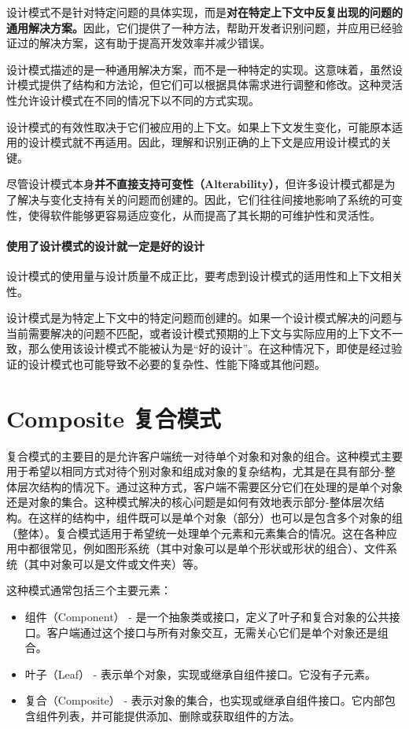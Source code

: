 设计模式不是针对特定问题的具体实现，而是\textbf{对在特定上下文中反复出现的问题的通用解决方案。}因此，它们提供了一种方法，帮助开发者识别问题，并应用已经验证过的解决方案，这有助于提高开发效率并减少错误。

设计模式描述的是一种通用解决方案，而不是一种特定的实现。这意味着，虽然设计模式提供了结构和方法论，但它们可以根据具体需求进行调整和修改。这种灵活性允许设计模式在不同的情况下以不同的方式实现。

设计模式的有效性取决于它们被应用的上下文。如果上下文发生变化，可能原本适用的设计模式就不再适用。因此，理解和识别正确的上下文是应用设计模式的关键。

尽管设计模式本身\textbf{并不直接支持可变性（Alterability）}，但许多设计模式都是为了解决与变化支持有关的问题而创建的。因此，它们往往间接地影响了系统的可变性，使得软件能够更容易适应变化，从而提高了其长期的可维护性和灵活性。


\paragraph{使用了设计模式的设计就一定是好的设计}设计模式的使用量与设计质量不成正比，要考虑到设计模式的适用性和上下文相关性。

设计模式是为特定上下文中的特定问题而创建的。如果一个设计模式解决的问题与当前需要解决的问题不匹配，或者设计模式预期的上下文与实际应用的上下文不一致，那么使用该设计模式不能被认为是“好的设计”。在这种情况下，即使是经过验证的设计模式也可能导致不必要的复杂性、性能下降或其他问题。

\section{Composite 复合模式}

复合模式的主要目的是允许客户端统一对待单个对象和对象的组合。这种模式主要用于希望以相同方式对待个别对象和组成对象的复杂结构，尤其是在具有部分-整体层次结构的情况下。通过这种方式，客户端不需要区分它们在处理的是单个对象还是对象的集合。这种模式解决的核心问题是如何有效地表示部分-整体层次结构。在这样的结构中，组件既可以是单个对象（部分）也可以是包含多个对象的组（整体）。复合模式适用于希望统一处理单个元素和元素集合的情况。这在各种应用中都很常见，例如图形系统（其中对象可以是单个形状或形状的组合）、文件系统（其中对象可以是文件或文件夹）等。


这种模式通常包括三个主要元素：
\begin{itemize}
	\item 组件（Component） - 是一个抽象类或接口，定义了叶子和复合对象的公共接口。客户端通过这个接口与所有对象交互，无需关心它们是单个对象还是组合。
	\item 叶子（Leaf） - 表示单个对象，实现或继承自组件接口。它没有子元素。
	\item 复合（Composite） - 表示对象的集合，也实现或继承自组件接口。它内部包含组件列表，并可能提供添加、删除或获取组件的方法。
	
\end{itemize}

